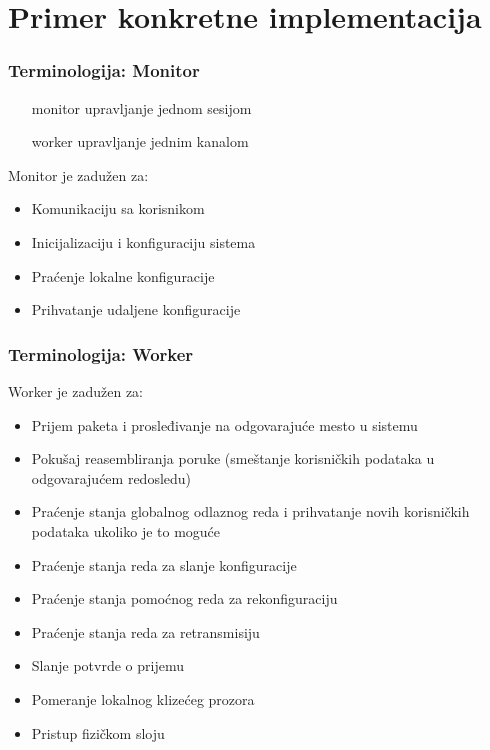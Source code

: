 \documentclass{beamer}
\begin{document}
\section{Primer konkretne implementacija}
    \begin{frame}
        \frametitle{Terminologija: Monitor}

        \begin{itemize}
            \item[monitor]{upravljanje jednom sesijom}
            \item[worker]{upravljanje jednim kanalom}
        \end{itemize}

        Monitor je zadužen za:
        \begin{itemize}
            \item{Komunikaciju sa korisnikom}
            \item{Inicijalizaciju i konfiguraciju sistema}
            \item{Praćenje lokalne konfiguracije}
            \item{Prihvatanje udaljene konfiguracije}
        \end{itemize}
    \end{frame}

    \begin{frame}
        \frametitle{Terminologija: Worker}

        Worker je zadužen za:
        \begin{itemize}
            \item{Prijem paketa i prosleđivanje na odgovarajuće mesto u sistemu}
            \item{Pokušaj reasembliranja poruke (smeštanje korisničkih podataka
                    u odgovarajućem redosledu)}
            \item{Praćenje stanja globalnog odlaznog reda i prihvatanje
                    novih korisničkih podataka ukoliko je to moguće}
            \item{Praćenje stanja reda za slanje konfiguracije}
            \item{Praćenje stanja pomoćnog reda za rekonfiguraciju}
            \item{Praćenje stanja reda za retransmisiju}
            \item{Slanje potvrde o prijemu}
            \item{Pomeranje lokalnog klizećeg prozora}
            \item{Pristup fizičkom sloju}
        \end{itemize}
    \end{frame}
\end{document}
